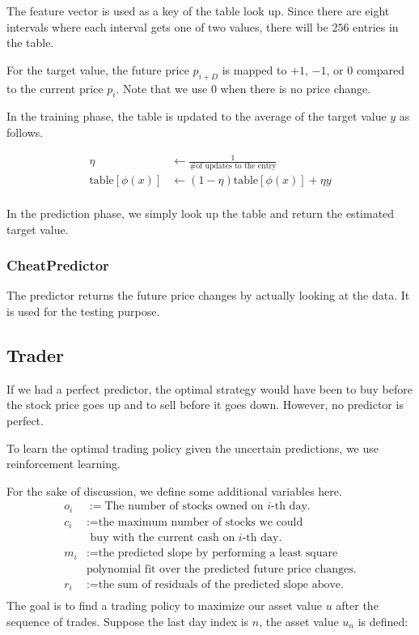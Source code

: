 \documentclass[twocolumn,10pt]{asme2ej}
\begin{document}
The feature vector is used as a key of the table look up. Since there
are eight intervals where each interval gets one of two values, there
will be $256$ entries in the table.

For the target value, the future price $p_{i+D}$ is mapped to $+1$,
$-1$, or $0$ compared to the current price $p_i$. Note that we use $0$
when there is no price change.

In the training phase, the table is updated to the average of the
target value $y$ as follows.

\begin{align*}
  \eta &\gets \frac{1}{\text{\# of updates to the entry}} \\
  \text{table}[\phi(x)] &\gets (1 - \eta)\text{table}[\phi(x)] + \eta y \\
\end{align*}

In the prediction phase, we simply look up the table and return the
estimated target value.

\subsubsection{CheatPredictor}

The predictor returns the future price changes by actually looking at the
data. It is used for the testing purpose.

\subsection{Trader}

If we had a perfect predictor, the optimal strategy would have been to
buy before the stock price goes up and to sell before it goes
down. However, no predictor is perfect.

To learn the optimal trading policy given the uncertain predictions,
we use reinforcement learning.

For the sake of discussion, we define some additional variables here.
\begin{align*}
  o_i &:= \text{The number of stocks owned on }i\text{-th day.} \\
  c_i &:= \text{the maximum number of stocks we could}\\
  & \text{ buy with the current cash on }i\text{-th day.} \\
  m_i &:= \text{the predicted slope by performing a least square} \\
  & \text{polynomial fit over the predicted future price changes.} \\
  r_i &:= \text{the sum of residuals of the predicted slope above.} \\
\end{align*}
The goal is to find a trading policy to maximize our asset value $u$
after the sequence of trades. Suppose the last day index is $n$, the
asset value $u_n$ is defined:
\end{document}
